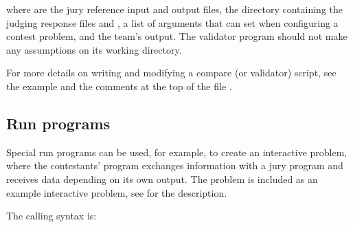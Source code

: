 \documentclass[a4paper,10pt,english,openany]{sphinxmanual}
\begin{document}
\begin{sphinxVerbatim}[commandchars=\\\{\}]
      
\end{sphinxVerbatim}

\sphinxAtStartPar
where   are the jury
reference input and output files,  the directory
containing the judging response files 
and ,
 a list of arguments that can set when
configuring a contest problem, and  the team’s
output. The validator program should not make any assumptions on its
working directory.

\sphinxAtStartPar
For more details on writing and modifying a compare (or validator)
script, see the  example and the comments at the
top of the file .


\subsection{Run programs}
\label{\detokenize{config-advanced:run-programs}}
\sphinxAtStartPar
Special run programs can be used, for example, to create an interactive
problem, where the contestants’ program exchanges information with a
jury program and receives data depending on its own output. The
problem  is included as an example interactive
problem, see  for the description.

\sphinxAtStartPar
The calling syntax is:

\begin{sphinxVerbatim}[commandchars=\\\{\}]
       
\end{sphinxVerbatim}
\end{document}
